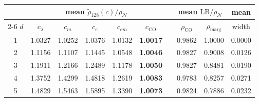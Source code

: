 \begin{tabular}{c ccccc c cc c}
\toprule
 & \multicolumn{5}{c}{mean $\tilde\rho_{128}(c)/\rho_\mathcal{N}$} & & \multicolumn{2}{c}{mean $\mathrm{LB}/\rho_\mathcal{N}$} & mean\\
\cmidrule{2-6}\cmidrule{8-9}
$d$ & $c_\lambda$ & $c_m$ & $c_e$ & $c_{em}$ & $c_{\mathrm{CO}}$ & & $\rho_{\mathrm{CO}}$ & $\rho_{\mathrm{marg}}$ & width\\
\midrule
1 & 1.0327 & 1.0252 & 1.0376 & 1.0132 & \textbf{1.0017} & & 0.9862 & 1.0000 & 0.0000\\
2 & 1.1156 & 1.1107 & 1.1445 & 1.0548 & \textbf{1.0046} & & 0.9827 & 0.9008 & 0.0126\\
3 & 1.1911 & 1.2166 & 1.2489 & 1.1178 & \textbf{1.0050} & & 0.9827 & 0.8481 & 0.0190\\
4 & 1.3752 & 1.4299 & 1.4818 & 1.2619 & \textbf{1.0083} & & 0.9783 & 0.8257 & 0.0271\\
5 & 1.4829 & 1.5463 & 1.5895 & 1.3390 & \textbf{1.0073} & & 0.9824 & 0.7886 & 0.0232\\
\bottomrule
\end{tabular}